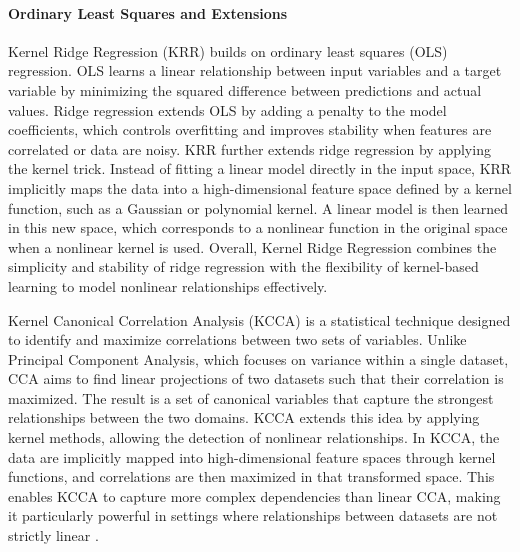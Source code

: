 \paragraph{Ordinary Least Squares and Extensions}
\label{sec:background_ml_lr}
Kernel Ridge Regression (KRR) builds on ordinary least squares (OLS) regression. OLS learns a linear relationship between input variables and a target variable by minimizing the squared difference between predictions and actual values. Ridge regression extends OLS by adding a penalty to the model coefficients, which controls overfitting and improves stability when features are correlated or data are noisy.
KRR further extends ridge regression by applying the kernel trick. Instead of fitting a linear model directly in the input space, KRR implicitly maps the data into a high-dimensional feature space defined by a kernel function, such as a Gaussian or polynomial kernel. A linear model is then learned in this new space, which corresponds to a nonlinear function in the original space when a nonlinear kernel is used.
Overall, Kernel Ridge Regression combines the simplicity and stability of ridge regression with the flexibility of kernel-based learning to model nonlinear relationships effectively.

\label{sec:background_ml_kcca}
Kernel Canonical Correlation Analysis (KCCA) is a statistical technique designed to identify and maximize correlations between two sets of variables. Unlike Principal Component Analysis, which focuses on variance within a single dataset, CCA aims to find linear projections of two datasets such that their correlation is maximized. The result is a set of canonical variables that capture the strongest relationships between the two domains. KCCA extends this idea by applying kernel methods, allowing the detection of nonlinear relationships. In KCCA, the data are implicitly mapped into high-dimensional feature spaces through kernel functions, and correlations are then maximized in that transformed space. This enables KCCA to capture more complex dependencies than linear CCA, making it particularly powerful in settings where relationships between datasets are not strictly linear \cite{1202783} \cite{5644899}.

